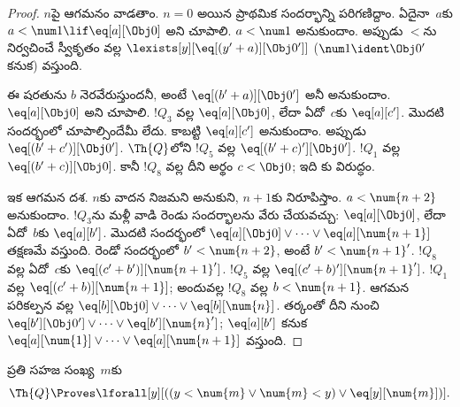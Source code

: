 \documentclass[../../../include/open-logic-section]{subfiles}
\begin{document}
\begin{proof}
$n$పై ఆగమనం వాడతాం. $n=0$ అయిన ప్రాథమిక సందర్భాన్ని పరిగణిద్దాం. ఏదైనా~$a$కు
$a<\num 1\lif\eq[a][\Obj 0]$ అని చూపాలి. $a<\num 1$ అనుకుందాం. అప్పుడు
$<$ను నిర్వచించే స్వీకృతం వల్ల $\lexists[y][\eq[(y'+a)][\Obj 0']]$
($\num 1\ident\Obj 0'$ కనుక) వస్తుంది.

ఈ షరతును $b$ నెరవేరుస్తుందనీ, అంటే $\eq[(b'+a)][\Obj 0']$ అనీ అనుకుందాం.
$\eq[a][\Obj 0]$ అని చూపాలి. $!Q_3$ వల్ల $\eq[a][\Obj 0]$, లేదా ఏదో~$c$కు
$\eq[a][c']$. మొదటి సందర్భంలో చూపాల్సిందేమీ లేదు. కాబట్టి $\eq[a][c']$
అనుకుందాం. అప్పుడు $\eq[(b'+c')][\Obj 0']$. $\Th{Q}$లోని $!Q_5$ వల్ల
$\eq[(b'+c)'][\Obj 0']$. $!Q_1$ వల్ల $\eq[(b'+c)][\Obj 0]$. కానీ $!Q_8$
వల్ల దీని అర్థం $c<\Obj 0$; ఇది కు విరుద్ధం.

ఇక ఆగమన దశ. $n$కు వాదన నిజమని అనుకుని, $n+1$కు నిరూపిస్తాం.
$a<\num{n+2}$ అనుకుందాం. $!Q_3$ను మళ్లీ వాడి రెండు సందర్భాలను వేరు చేయవచ్చు:
$\eq[a][\Obj 0]$, లేదా ఏదో~$b$కు $\eq[a][b']$. మొదటి సందర్భంలో
$\eq[a][\Obj 0]\lor\dots\lor\eq[a][\num{n+1}]$ తక్షణమే వస్తుంది. రెండో
సందర్భంలో $b'<\num{n+2}$, అంటే $b'<\num{n+1}'$. $!Q_8$ వల్ల ఏదో~$c$కు
$\eq[(c'+b')][\num{n+1}']$. $!Q_5$ వల్ల
$\eq[(c'+b)'][\num{n+1}']$. $!Q_1$ వల్ల
$\eq[(c'+b)][\num{n+1}]$; అందువల్ల $!Q_8$ వల్ల $b<\num{n+1}$.
ఆగమన పరికల్పన వల్ల $\eq[b][\Obj 0]\lor\dots\lor\eq[b][\num{n}]$.
తర్కంతో దీని నుంచి $\eq[b'][\Obj 0']\lor\dots\lor\eq[b'][\num{n}']$;
$\eq[a][b']$ కనుక $\eq[a][\num{1}]\lor\dots\lor\eq[a][\num{n+1}]$ వస్తుంది.
\end{proof}

\begin{lem}
   ప్రతి సహజ సంఖ్య~$m$కు
  \[
  \Th{Q} \Proves
  \lforall[y][((y < \num{m} \lor \num{m} < y) \lor \eq[y][\num{m}])].
  \]
\end{lem}
\end{document}
